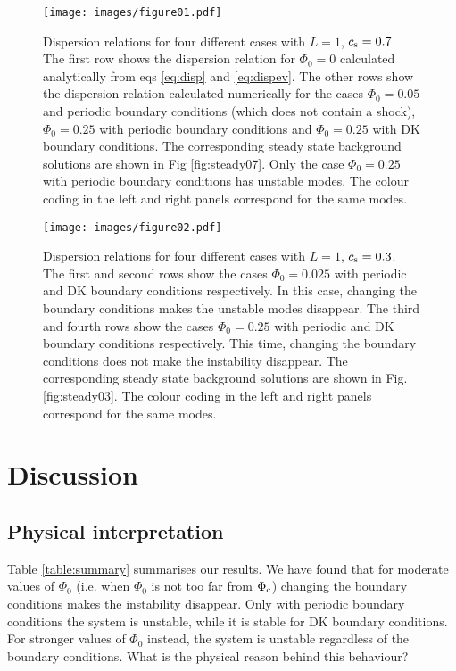 \documentclass[useAMS,usenatbib]{mn2e}
\begin{document}
\begin{figure*}
\texttt{[image: images/figure01.pdf]}
 \caption{Dispersion relations for four different cases with $L=1$, $c_{\rm s}=0.7$. The first row shows the dispersion relation for $\Phi_0=0$ calculated analytically from eqs \eqref{eq:disp} and \eqref{eq:dispev}. The other rows show the dispersion relation calculated numerically for the cases $\Phi_0=0.05$ and periodic boundary conditions (which does not contain a shock), $\Phi_0=0.25$ with periodic boundary conditions and $\Phi_0=0.25$ with DK boundary conditions. The corresponding steady state background solutions are shown in Fig
  \ref{fig:steady07}. Only the case $\Phi_0=0.25$ with periodic boundary conditions has unstable modes. The colour coding in the left and right panels correspond for the same modes.}
\label{fig:stability1} 
\end{figure*}

\begin{figure*}
\texttt{[image: images/figure02.pdf]}
 \caption{Dispersion relations for four different cases with $L=1$, $c_{\rm s}=0.3$. The first and second rows show the cases $\Phi_0=0.025$ with periodic and DK boundary conditions respectively. In this case, changing the boundary conditions makes the unstable modes disappear. The third and fourth rows show the cases  $\Phi_0=0.25$ with periodic and DK boundary conditions respectively. This time, changing the boundary conditions does not make the instability disappear. The corresponding steady state background solutions are shown in Fig. \ref{fig:steady03}. The colour coding in the left and right panels correspond for the same modes.}
\label{fig:stability2} 
\end{figure*}

\section{Discussion} \label{sec:discussion}

\subsection{Physical interpretation} \label{sec:interpretation}

Table \ref{table:summary} summarises our results. We have found that for moderate values of $\Phi_0$ (i.e. when $\Phi_0$ is not too far from $\Phi_{\rm c}$) changing the boundary conditions makes the instability disappear. Only with periodic boundary conditions the system is unstable, while it is stable for DK boundary conditions. For stronger values of $\Phi_0$ instead, the system is unstable regardless of the boundary conditions. What is the physical reason behind this behaviour?
\end{document}
